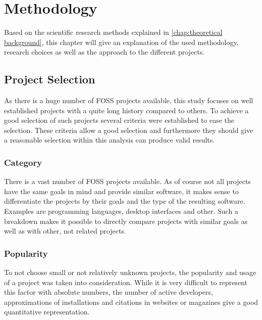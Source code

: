 \chapter{Methodology} %
\label{chap:methodology}

Based on the scientific research methods explained in \autoref{chap:theoretical
background}, this chapter will give an explanation of the used methodology,
research choices as well as the approach to the different projects.

\section{Project Selection} %

As there is a huge number of \ac{FOSS} projects available, this study focuses
on well established projects with a quite long history compared to others. To
achieve a good selection of such projects several criteria were established to
ease the selection. These criteria allow a good selection and furthermore they
should give a reasonable selection within this analysis can produce valid
results.

\subsection{Category} %

There is a vast number of \ac{FOSS} projects available. As of course not all
projects have the same goals in mind and provide similar software, it makes
sense to differentiate the projects by their goals and the type of the
resulting software. Examples are programming languages, desktop interfaces and
other. Such a breakdown makes it possible to directly compare projects with
similar goals as well as with other, not related projects.


\subsection{Popularity} %

To not choose small or not relatively unknown projects, the popularity and
usage of a project was taken into consideration. While it is very difficult to
represent this factor with absolute numbers, the number of active developers,
approximations of installations and citations in websites or magazines give a
good quantitative representation.


